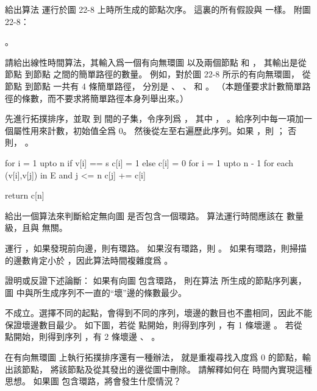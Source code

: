 \startsection[
  title={Topological sort},
]

\startEXERCISE
給出算法  運行於圖 22-8 上時所生成的節點次序。
這裏的所有假設與 一樣。
附圖 22-8：

\externalfigure[output/e22_4_1-1]
\stopEXERCISE

\startANSWER
{}。
\stopANSWER

\startEXERCISE
請給出線性時間算法，其輸入爲一個有向無環圖  以及兩個節點  和 ，
其輸出是從節點  到節點  之間的簡單路徑的數量。
例如，對於圖 22-8 所示的有向無環圖，
從節點  到節點  一共有 4 條簡單路徑，
分別是 、 、  和 。
（本題僅要求計數簡單路徑的條數，而不要求將簡單路徑本身列舉出來。）
\stopEXERCISE

\startANSWER
先進行拓撲排序，並取  到  間的子集，令序列爲 ，
其中 ， 。給序列中每一項加一個屬性用來計數，初始值全爲 0。
然後從左至右遍歷此序列。如果 ，則 ；
否則， 。

\startCLRS
for i = 1 upto n
	if v[i] == s
		c[i] = 1
	else
		c[i] = 0
for i = 1 upto n - 1
	for each (v[i],v[j]) in E and j <= n
		c[j] += c[i]

return c[n]
\stopCLRS
\stopANSWER

\startEXERCISE
給出一個算法來判斷給定無向圖  是否包含一個環路。
算法運行時間應該在  數量級，且與  無關。
\stopEXERCISE

\startANSWER
運行 ，如果發現前向邊，則有環路。
如果沒有環路，則 。
如果有環路，則掃描的邊數肯定小於 ，因此算法時間複雜度爲 。
\stopANSWER

\startEXERCISE
證明或反證下述論斷：
如果有向圖  包含環路，
則在算法  所生成的節點序列裏，
圖  中與所生成序列不一直的“壞”邊的條數最少。
\stopEXERCISE

\startANSWER
不成立。選擇不同的起點，會得到不同的序列，壞邊的數目也不盡相同，因此不能保證壞邊數目最少。
如下圖，若從  點開始，則得到序列 ，有 1 條壞邊 。
若從  點開始，則得到序列 ，有 2 條壞邊 、 。

\externalfigure[output/e22_4_4-1]
\stopANSWER

\startEXERCISE
在有向無環圖  上執行拓撲排序還有一種辦法，
就是重複尋找入度爲 0 的節點，輸出該節點，
將該節點及從其發出的邊從圖中刪除。
請解釋如何在  時間內實現這種思想。
如果圖  包含環路，將會發生什麼情況？
\stopEXERCISE

